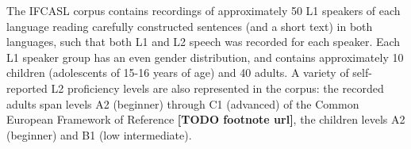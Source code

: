 \documentclass[a4paper]{article}
\newcommand{\TODO}[1]{{\color{red}\textbf{[TODO #1]}}}
\begin{document}
	The IFCASL corpus contains recordings of approximately 50 L1 speakers of each language reading carefully constructed sentences (and a short text) in both languages, such that both L1 and L2 speech was recorded for each speaker. Each L1 speaker group has an even gender distribution, and contains approximately 10 children (adolescents of 15-16 years of age) and 40 adults. A variety of self-reported L2 proficiency levels are also represented in the corpus: the recorded adults span levels A2 (beginner) through C1 (advanced) of the Common European Framework of Reference \TODO{footnote url}, the children levels A2 (beginner) and B1 (low intermediate).
	
\end{document}
